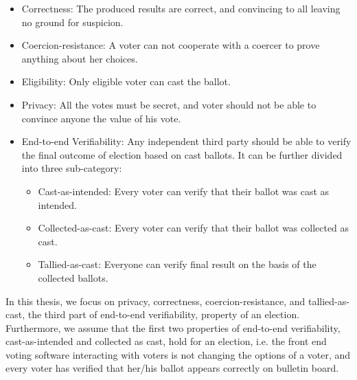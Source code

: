  \begin{itemize}
 
  \item Correctness:
 	The produced results are correct, and convincing to all leaving no  ground for suspicion. 

 \item Coercion-resistance: A voter can not cooperate with a coercer to prove anything about her choices.
 
 \item Eligibility: Only eligible voter can cast the ballot.
 	
 \item Privacy:
    All the votes must be secret, and voter should not be able to convince anyone the 
    value of his vote.
 
 \item End-to-end Verifiability:
 Any independent third party should be able to verify the final outcome of election based on cast 
 ballots.  It can be further divided into three sub-category:
 
 \begin{itemize}
  \item Cast-as-intended: Every voter can verify that their ballot was cast as
  intended.
  \item Collected-as-cast: Every voter can verify that their ballot was collected as
  cast.
  \item Tallied-as-cast: Everyone can verify final result on the basis of the
  collected ballots.
\end{itemize}
\end{itemize}
	

In this thesis, we focus on privacy, correctness, coercion-resistance, and tallied-as-cast, the third part of end-to-end verifiability, property 
of an election. Furthermore, we assume that the first two properties of end-to-end verifiability, cast-as-intended and 
collected as cast, hold for an election, i.e. the front end voting software interacting with voters is not 
changing the options of a voter, and every voter has verified that her/his ballot appears correctly on bulletin board. 

